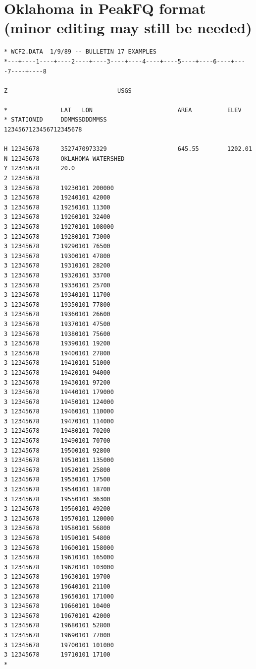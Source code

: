\documentclass[12pt]{article}
\begin{document}
\clearpage

\section*{\small{Oklahoma in PeakFQ format (minor editing may still be needed)}}
\begin{verbatim}
* WCF2.DATA  1/9/89 -- BULLETIN 17 EXAMPLES
*---+----1----+----2----+----3----+----4----+----5----+----6----+----7----+----8

Z                               USGS

*               LAT   LON                        AREA          ELEV
* STATIONID     DDMMSSDDDMMSS                    1234567123456712345678

H 12345678      3527470973329                    645.55        1202.01
N 12345678      OKLAHOMA WATERSHED
Y 12345678      20.0
2 12345678
3 12345678      19230101 200000
3 12345678      19240101 42000
3 12345678      19250101 11300
3 12345678      19260101 32400
3 12345678      19270101 108000
3 12345678      19280101 73000
3 12345678      19290101 76500
3 12345678      19300101 47800
3 12345678      19310101 28200
3 12345678      19320101 33700
3 12345678      19330101 25700
3 12345678      19340101 11700
3 12345678      19350101 77800
3 12345678      19360101 26600
3 12345678      19370101 47500
3 12345678      19380101 75600
3 12345678      19390101 19200
3 12345678      19400101 27800
3 12345678      19410101 51000
3 12345678      19420101 94000
3 12345678      19430101 97200
3 12345678      19440101 179000
3 12345678      19450101 124000
3 12345678      19460101 110000
3 12345678      19470101 114000
3 12345678      19480101 70200
3 12345678      19490101 70700
3 12345678      19500101 92800
3 12345678      19510101 135000
3 12345678      19520101 25800
3 12345678      19530101 17500
3 12345678      19540101 18700
3 12345678      19550101 36300
3 12345678      19560101 49200
3 12345678      19570101 120000
3 12345678      19580101 56800
3 12345678      19590101 54800
3 12345678      19600101 158000
3 12345678      19610101 165000
3 12345678      19620101 103000
3 12345678      19630101 19700
3 12345678      19640101 21100
3 12345678      19650101 171000
3 12345678      19660101 10400
3 12345678      19670101 42000
3 12345678      19680101 52800
3 12345678      19690101 77000
3 12345678      19700101 101000
3 12345678      19710101 17100         
*

\end{verbatim}

\clearpage
\end{document}

